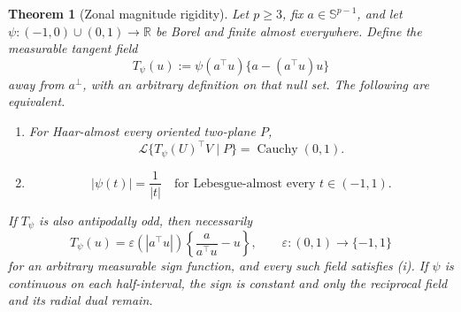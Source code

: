 \documentclass[11pt]{article}
\numberwithin{equation}{section}
\theoremstyle{thmstyleone}%
\newtheorem{theorem}{Theorem}[section]
\theoremstyle{thmstyletwo}%
\newcommand{\R}{\mathbb R}
\newcommand{\sphere}{\mathbb S}
\newcommand{\Cauchy}{\operatorname{Cauchy}}
\newcommand{\Law}{\mathcal L}
\begin{document}
\begin{theorem}[Zonal magnitude rigidity]
\label{thm:zonal-rigidity}
Let \(p\geq3\), fix \(a\in\sphere^{p-1}\), and let
\(\psi:(-1,0)\cup(0,1)\to\R\) be Borel and finite almost everywhere.
Define the measurable tangent field
\begin{equation}
  T_\psi(u)
  :=
  \psi(a^\top u)\{a-(a^\top u)u\}
  \label{eq:zonal-field}
\end{equation}
away from \(a^\perp\), with an arbitrary definition on that null set.
The following are equivalent.
\begin{enumerate}[label=\textup{(\roman*)}]
\item For Haar-almost every oriented two-plane \(P\),
  \[
    \Law\{T_\psi(U)^\top V\mid P\}=\Cauchy(0,1).
  \]
\item
  \[
    |\psi(t)|=\frac1{|t|}
    \quad\text{for Lebesgue-almost every }t\in(-1,1).
  \]
\end{enumerate}
If \(T_\psi\) is also antipodally odd, then necessarily
\begin{equation}
  T_\psi(u)
  =
  \varepsilon(|a^\top u|)
  \left\{\frac{a}{a^\top u}-u\right\},
  \qquad
  \varepsilon:(0,1)\to\{-1,1\}
  \label{eq:zonal-sign-family}
\end{equation}
for an arbitrary measurable sign function, and every such field satisfies
\textup{(i)}.  If \(\psi\) is continuous on each half-interval, the sign is
constant and only the reciprocal field and its radial dual remain.
\end{theorem}
\end{document}

